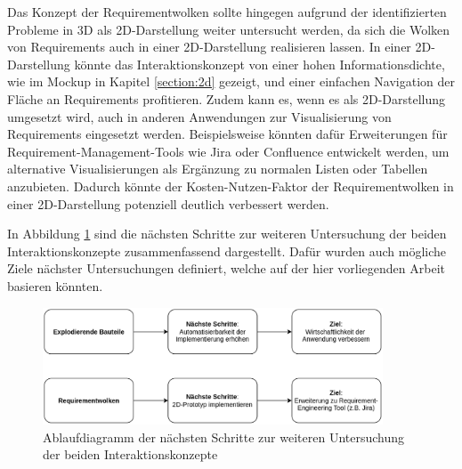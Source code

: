 Das Konzept der Requirementwolken sollte hingegen aufgrund der identifizierten Probleme in 3D als 2D-Darstellung weiter untersucht werden, da sich die Wolken von Requirements auch in einer 2D-Darstellung realisieren lassen.
In einer 2D-Darstellung könnte das Interaktionskonzept von einer hohen Informationsdichte, wie im Mockup in Kapitel \ref{section:2d} gezeigt, und einer einfachen Navigation der Fläche an Requirements profitieren.
Zudem kann es, wenn es als 2D-Darstellung umgesetzt wird, auch in anderen Anwendungen zur Visualisierung von Requirements eingesetzt werden.
Beispielsweise könnten dafür Erweiterungen für Requirement-Management-Tools wie Jira oder Confluence entwickelt werden, um alternative Visualisierungen als Ergänzung zu normalen Listen oder Tabellen anzubieten.
Dadurch könnte der Kosten-Nutzen-Faktor der Requirementwolken in einer 2D-Darstellung potenziell deutlich verbessert werden.

\newpage

In Abbildung \ref{fig:ausblick-ablauf} sind die nächsten Schritte zur weiteren Untersuchung der beiden Interaktionskonzepte zusammenfassend dargestellt.
Dafür wurden auch mögliche Ziele nächster Untersuchungen definiert, welche auf der hier vorliegenden Arbeit basieren könnten. 

\begin{figure}[H]
    \centering
    \includegraphics[width=0.9\textwidth]{images/AusblickAblaufdiagramm.png}
    \caption{Ablaufdiagramm der nächsten Schritte zur weiteren Untersuchung der beiden Interaktionskonzepte}
    \label{fig:ausblick-ablauf}
\end{figure}

